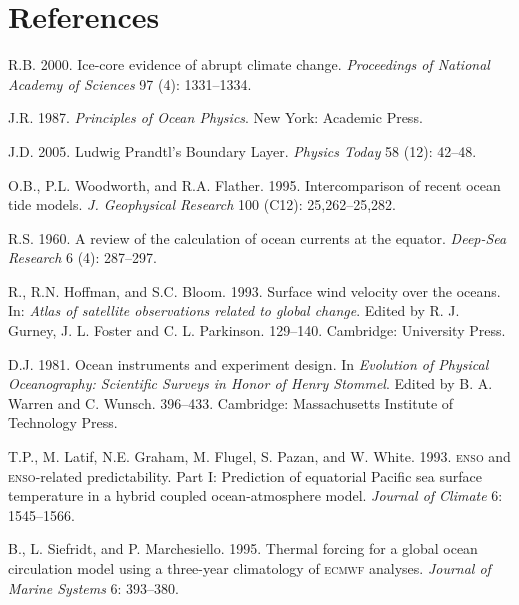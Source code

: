 \chapter{References}
\begin{description}
\setlength{\itemsep}{0pt}
\footnotesize

\item [Alley]R.B. 2000. Ice-core evidence of abrupt climate change.
\textit{Proceedings of National Academy of Sciences} 97 (4): 1331--1334.

\item[Apel]J.R. 1987. \textit{Principles of Ocean Physics}.  New York:
Academic Press.

\item [Anderson]J.D. 2005. Ludwig Prandtl's Boundary
Layer. \textit{Physics Today} 58 (12): 42--48.

\item [Andersen]O.B., P.L. Woodworth, and
R.A. Flather. 1995. Intercomparison of recent ocean tide
models. \textit{J. Geophysical Research} 100 (C12): 25,262--25,282.

\item [Arthur]R.S. 1960. A review of the calculation of ocean currents
at the equator. \textit{Deep-Sea Research} 6 (4): 287--297.

\item [Atlas]R., R.N. Hoffman, and S.C. Bloom. 1993. Surface wind
velocity over the oceans. In: \textit{Atlas of satellite
observations related to global change}. Edited by R. J. Gurney,
J. L. Foster and C. L. Parkinson. 129--140. Cambridge: University Press.

\item [Baker]D.J. 1981. Ocean instruments and experiment design. In
\textit{Evolution of Physical Oceanography: Scientific Surveys in
Honor of Henry Stommel}. Edited by B. A. Warren and
C. Wunsch. 396--433. Cambridge: Massachusetts Institute of Technology Press.

\item [Barnett]T.P., M. Latif, N.E. Graham, M. Flugel, S. Pazan, and
W. White.  1993. \textsc{enso} and \textsc{enso}-related
predictability. Part I: Prediction of equatorial Pacific sea surface
temperature in a hybrid coupled ocean-atmosphere
model. \textit{Journal of Climate} 6: 1545--1566.

\item [Barnier]B., L. Siefridt, and P. Marchesiello. 1995. Thermal
forcing for a global ocean circulation model using a three-year
climatology of \textsc{ecmwf} analyses. \textit{Journal of Marine
Systems} 6: 393--380.


\end{description}
